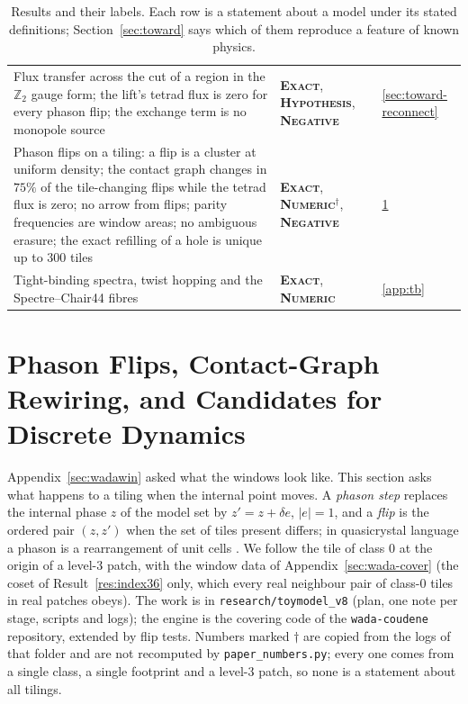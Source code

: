 \documentclass[11pt]{article}
\newcommand{\exact}{\textbf{\textsc{Exact}}}
\newcommand{\numeric}{\textbf{\textsc{Numeric}}}
\newcommand{\hypo}{\textbf{\textsc{Hypothesis}}}
\newcommand{\negres}{\textbf{\textsc{Negative}}}
\theoremstyle{definition}
\begin{document}
\begin{table}[t]
\begin{tabular}{@{}p{104mm}p{26mm}p{14mm}@{}}
Flux transfer across the cut of a region in the $\mathbb{Z}_2$ gauge form; the lift's tetrad flux is zero for every phason flip; the exchange term is no monopole source & \exact, \hypo, \negres & \ref{sec:toward-reconnect} \\
Phason flips on a tiling: a flip is a cluster at uniform density; the contact graph changes in $75\%$ of the tile-changing flips while the tetrad flux is zero; no arrow from flips; parity frequencies are window areas; no ambiguous erasure; the exact refilling of a hole is unique up to $300$ tiles & \exact, \numeric$^\dagger$, \negres & \ref{sec:flips} \\
Tight-binding spectra, twist hopping and the Spectre--Chair44 fibres & \exact, \numeric & \ref{app:tb} \\
\bottomrule
\end{tabular}
\caption{Results and their labels. Each row is a statement about a model under its stated definitions; Section~\ref{sec:toward} says which of them reproduce a feature of known physics.}\label{tab:summary}
\end{table}


\section{Phason Flips, Contact-Graph Rewiring, and Candidates for Discrete Dynamics}
\label{sec:flips}

Appendix~\ref{sec:wadawin} asked what the windows look like. This section asks what happens to a tiling when the internal point moves. A \emph{phason step} replaces the internal phase $z$ of the model set by $z'=z+\delta e$, $|e|=1$, and a \emph{flip} is the ordered pair $(z,z')$ when the set of tiles present differs; in quasicrystal language a phason is a rearrangement of unit cells \cite{socolar1986}. We follow the tile of class $0$ at the origin of a level-$3$ patch, with the window data of Appendix~\ref{sec:wada-cover} (the coset of Result~\ref{res:index36} only, which every real neighbour pair of class-$0$ tiles in real patches obeys). The work is in \texttt{research/toymodel\_v8} (plan, one note per stage, scripts and logs); the engine is the covering code of the \texttt{wada-coudene} repository, extended by flip tests. Numbers marked $\dagger$ are copied from the logs of that folder and are not recomputed by \texttt{paper\_numbers.py}; every one comes from a single class, a single footprint and a level-$3$ patch, so none is a statement about all tilings.
\end{document}
